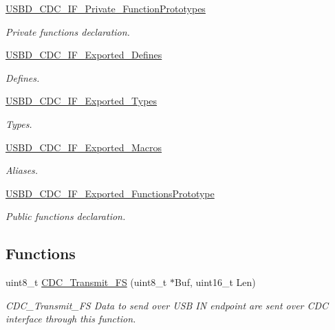 \begin{DoxyCompactItemize}
\hyperlink{group__USBD__CDC__IF__Private__FunctionPrototypes}{U\+S\+B\+D\+\_\+\+C\+D\+C\+\_\+\+I\+F\+\_\+\+Private\+\_\+\+Function\+Prototypes}
\begin{DoxyCompactList}\small\item\em Private functions declaration. \end{DoxyCompactList}\item 
\hyperlink{group__USBD__CDC__IF__Exported__Defines}{U\+S\+B\+D\+\_\+\+C\+D\+C\+\_\+\+I\+F\+\_\+\+Exported\+\_\+\+Defines}
\begin{DoxyCompactList}\small\item\em Defines. \end{DoxyCompactList}\item 
\hyperlink{group__USBD__CDC__IF__Exported__Types}{U\+S\+B\+D\+\_\+\+C\+D\+C\+\_\+\+I\+F\+\_\+\+Exported\+\_\+\+Types}
\begin{DoxyCompactList}\small\item\em Types. \end{DoxyCompactList}\item 
\hyperlink{group__USBD__CDC__IF__Exported__Macros}{U\+S\+B\+D\+\_\+\+C\+D\+C\+\_\+\+I\+F\+\_\+\+Exported\+\_\+\+Macros}
\begin{DoxyCompactList}\small\item\em Aliases. \end{DoxyCompactList}\item 
\hyperlink{group__USBD__CDC__IF__Exported__FunctionsPrototype}{U\+S\+B\+D\+\_\+\+C\+D\+C\+\_\+\+I\+F\+\_\+\+Exported\+\_\+\+Functions\+Prototype}
\begin{DoxyCompactList}\small\item\em Public functions declaration. \end{DoxyCompactList}\end{DoxyCompactItemize}
\subsection*{Functions}
\begin{DoxyCompactItemize}
\item 
uint8\+\_\+t \hyperlink{group__USBD__CDC__IF_ga5137d6201dbdef2bf351c5b4941c24f4}{C\+D\+C\+\_\+\+Transmit\+\_\+\+FS} (uint8\+\_\+t $\ast$Buf, uint16\+\_\+t Len)
\begin{DoxyCompactList}\small\item\em C\+D\+C\+\_\+\+Transmit\+\_\+\+FS Data to send over U\+SB IN endpoint are sent over C\+DC interface through this function. \end{DoxyCompactList}\end{DoxyCompactItemize}
